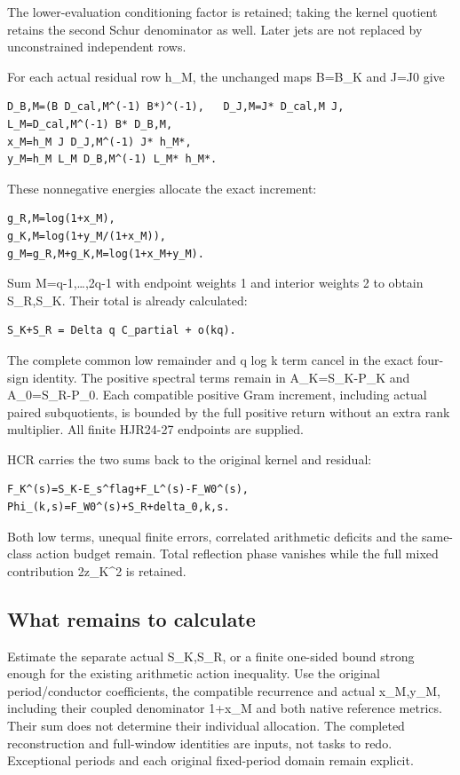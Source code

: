 \documentclass[
]{article}
\begin{document}
The lower-evaluation conditioning factor is retained; taking the kernel
quotient retains the second Schur denominator as well. Later jets are
not replaced by unconstrained independent rows.

For each actual residual row h\_M, the unchanged maps B=B\_K and J=J0
give

\begin{verbatim}
D_B,M=(B D_cal,M^(-1) B*)^(-1),   D_J,M=J* D_cal,M J,
L_M=D_cal,M^(-1) B* D_B,M,
x_M=h_M J D_J,M^(-1) J* h_M*,
y_M=h_M L_M D_B,M^(-1) L_M* h_M*.
\end{verbatim}

These nonnegative energies allocate the exact increment:

\begin{verbatim}
g_R,M=log(1+x_M),
g_K,M=log(1+y_M/(1+x_M)),
g_M=g_R,M+g_K,M=log(1+x_M+y_M).
\end{verbatim}

Sum M=q-1,\ldots,2q-1 with endpoint weights 1 and interior weights 2 to
obtain S\_R,S\_K. Their total is already calculated:

\begin{verbatim}
S_K+S_R = Delta q C_partial + o(kq).
\end{verbatim}

The complete common low remainder and q log k term cancel in the exact
four-sign identity. The positive spectral terms remain in A\_K=S\_K-P\_K
and A\_0=S\_R-P\_0. Each compatible positive Gram increment, including
actual paired subquotients, is bounded by the full positive return
without an extra rank multiplier. All finite HJR24-27 endpoints are
supplied.

HCR carries the two sums back to the original kernel and residual:

\begin{verbatim}
F_K^(s)=S_K-E_s^flag+F_L^(s)-F_W0^(s),
Phi_(k,s)=F_W0^(s)+S_R+delta_0,k,s.
\end{verbatim}

Both low terms, unequal finite errors, correlated arithmetic deficits
and the same-class action budget remain. Total reflection phase vanishes
while the full mixed contribution 2\textbar z\_K\textbar\^{}2 is
retained.

\subsection{What remains to
calculate}\label{what-remains-to-calculate-1}

Estimate the separate actual S\_K,S\_R, or a finite one-sided bound
strong enough for the existing arithmetic action inequality. Use the
original period/conductor coefficients, the compatible recurrence and
actual x\_M,y\_M, including their coupled denominator 1+x\_M and both
native reference metrics. Their sum does not determine their individual
allocation. The completed reconstruction and full-window identities are
inputs, not tasks to redo. Exceptional periods and each original
fixed-period domain remain explicit.
\end{document}
